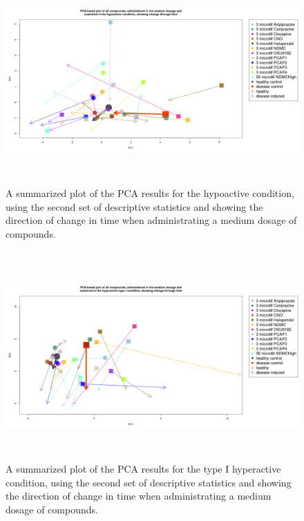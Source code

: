 \documentclass[a4paper,12pt]{article}
\begin{document}
\newpage
\begin{figure}[h!]
\begin{center}
\includegraphics[width=16cm,height=8cm]{All_together_3_microM_DarkApoLow_in_time_set2.png}
\caption{A summarized plot of the PCA results for the hypoactive condition, using the second set of descriptive statistics and showing the direction of change in time when administrating a medium dosage of compounds.}
\end{center}
\end{figure}
\newpage
\begin{figure}[h!]
\begin{center}
\includegraphics[width=16cm,height=8cm]{All_together_3_microM_DarkApoHigh_in_time_set2.png}
\caption{A summarized plot of the PCA results for the type I hyperactive condition, using the second set of descriptive statistics and showing the direction of change in time when administrating a medium dosage of compounds.}
\end{center}
\end{figure}
\end{document}

